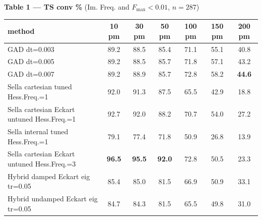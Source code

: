 \documentclass[11pt]{article}
\begin{document}
\begin{center}\footnotesize
\textbf{Table 1 — TS conv \%} (Im. Freq. and $F_\mathrm{max}<0.01$, $n=287$)\\[0.3em]
\begin{tabular}{l|cccccc}
\toprule
\textbf{method} & \textbf{10 pm} & \textbf{30 pm} & \textbf{50 pm} & \textbf{100 pm} & \textbf{150 pm} & \textbf{200 pm} \\
\midrule
GAD dt=0.003                                & 89.2 & 88.5 & 85.4 & 71.1 & 55.1 & 40.8 \\
GAD dt=0.005                                & 89.2 & 88.5 & 85.7 & 71.8 & 57.1 & 43.2 \\
GAD dt=0.007                                & 89.2 & 88.9 & 85.7 & 72.8 & 58.2 & \textbf{44.6} \\
\midrule
Sella cartesian tuned Hess.Freq.=1          & 92.0 & 91.3 & 87.5 & 65.5 & 42.9 & 18.8 \\
Sella cartesian Eckart untuned Hess.Freq.=1 & 92.7 & 92.0 & 88.2 & 70.7 & 54.0 & 27.2 \\
Sella internal tuned Hess.Freq.=1           & 79.1 & 77.4 & 71.8 & 50.9 & 26.8 & 13.9 \\
Sella cartesian Eckart untuned Hess.Freq.=3 & \textbf{96.5} & \textbf{95.5} & \textbf{92.0} & 72.8 & 50.5 & 23.3 \\
\midrule
Hybrid damped Eckart eig tr=0.05            & 85.4 & 85.0 & 81.5 & 66.9 & 50.9 & 33.1 \\
Hybrid undamped Eckart eig tr=0.05          & 84.7 & 84.3 & 81.5 & 65.5 & 49.8 & 31.0 \\
\bottomrule
\end{tabular}
\end{center}
\end{document}
